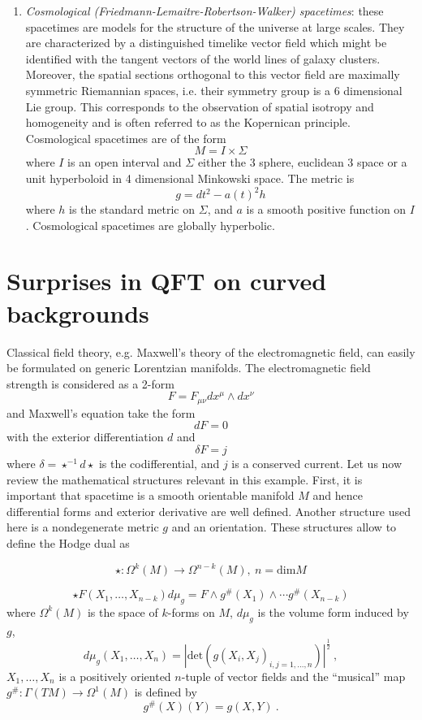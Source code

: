 \documentclass[12pt]{article}
\newcommand{\1}{\mathds{1}}                         %
\begin{document}
\begin{enumerate}
\item \textit{Cosmological (Friedmann-Lemaitre-Robertson-Walker) spacetimes}: these spacetimes are models for the structure of the universe at large scales. They are characterized by a distinguished timelike vector field which might be identified with the tangent vectors of the world lines of galaxy clusters. Moreover, the spatial sections orthogonal to this vector field are maximally symmetric Riemannian spaces, 
i.e. their symmetry group is a 6 dimensional Lie group. This corresponds to the observation of spatial isotropy and homogeneity and is often referred to as the Kopernican principle. Cosmological spacetimes  are of the form
\[M=I\times \Sigma\]
where $I$ is an open interval and $\Sigma$ either the 3 sphere, euclidean 3 space or a unit hyperboloid in 4 dimensional Minkowski space. 
The metric is 
\[g=dt^2-a(t)^2h\]
where $h$ is the standard metric on $\Sigma$,
and $a$ is a smooth positive function on $I$.  Cosmological spacetimes are globally hyperbolic.
\end{enumerate}
\section{Surprises in QFT on curved backgrounds}
Classical field theory, e.g. Maxwell's theory of the electromagnetic field, can easily be formulated on generic Lorentzian manifolds. The electromagnetic field strength is considered as a 2-form
\[
F=F_{\mu\nu}dx^{\mu}\wedge dx^{\nu}
\]
and Maxwell's equation take the form
\[dF=0\]
with the exterior differentiation $d$ and
\[\delta F=j\]
where $\delta=\star^{-1}d\star$ is the codifferential, and $j$ is a conserved current. Let us now review the mathematical structures relevant in this example. First, it is important that spacetime is a smooth orientable manifold $M$ and hence differential forms and exterior derivative are well defined. Another structure used here is a nondegenerate metric $g$ and an orientation. These structures allow to define the Hodge dual as

\[\star:\Omega^k(M)\to\Omega^{n-k}(M),\ n=\mathrm{dim}M \]

\[\star F(X_1,\dots,X_{n-k})d\mu_g=F\wedge g^{\#}(X_1)\wedge\cdots g^{\#}(X_{n-k})\] where $\Omega^k(M)$ is the space of $k$-forms on $M$, $d\mu_g$ is the volume form induced by $g$,
\[d\mu_g(X_1,\dots,X_n)=|\mathrm{det}\left(g(X_i,X_j)_{i,j=1,\dots,n}\right)|^{\frac12}\ ,\]
 $X_1,\dots,X_{n}$ is a positively oriented $n$-tuple of vector fields and the ``musical'' map $g^{\#}:\Gamma(TM)\to \Omega^1(M)$   is defined by
\[g^{\#}(X)(Y)=g(X,Y) \ .\]
\end{document}
